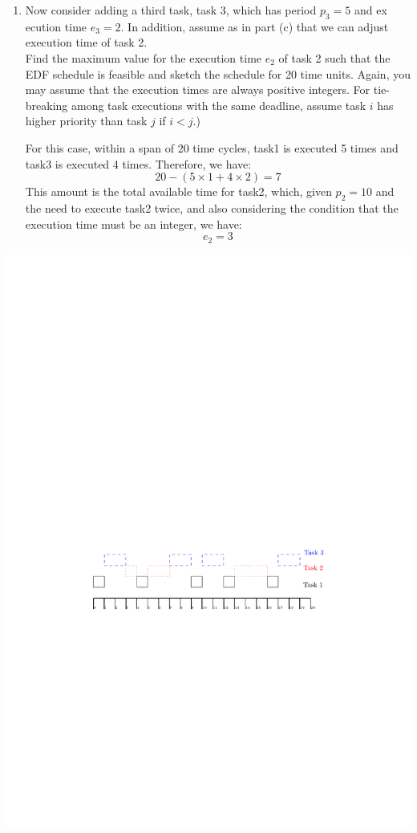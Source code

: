 \documentclass[12pt]{article}
\begin{document}
\begin{enumerate}
	\item 
	Now consider adding a third task, task 3, which has period $p_3 = 5$ and ex
	ecution time $e_3 = 2$. In addition, assume as in part (c) that we can adjust
	execution time of task 2.\\
	Find the maximum value for the execution time $e_2$ of task 2 such that the
	EDF schedule is feasible and sketch the schedule for 20 time units. Again,
	you may assume that the execution times are always positive integers. For
	tie-breaking among task executions with the same deadline, assume task $i$ has
	higher priority than task $j$ if $i < j$.)
	\begin{qsolve}
		For this case, within a span of 20 time cycles, task1 is executed 5 times and task3 is executed 4 times. Therefore, we have:
		$$ 20-(5\times 1+4\times2)=7 $$
		This amount is the total available time for task2, which, given $p_2=10$ and the need to execute task2 twice, and also considering the condition that the execution time must be an integer, we have:
		$$ e_2=3 $$
	\end{qsolve}
\end{enumerate}

\begin{qsolve}[Solution]
	\begin{center}
		\includegraphics*[width=0.7\linewidth]{images/Q4/e.pdf}
	\end{center}
\end{qsolve}
\vfil
\clearpage
\end{document}
